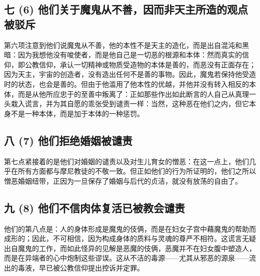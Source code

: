 
\subsection{七 (6) 他们关于魔鬼从不善，因而非天主所造的观点被驳斥}

第六项注意到他们说魔鬼从不善，他的本性不是天主的造化，而是出自混沌和黑暗：因为我想他没有唆使者，而是他自己是一切恶的根源和本体：然而真实的信仰，即公教信仰，承认一切精神或物质受造物的本体是善的，而恶没有正面存在；因为天主，宇宙的创造者，没有造出任何不是善的事物。因此，魔鬼若保持他受造时的状态，也会是善的。但由于他滥用了他本性的优越，并他并没有转入相反的本体，而是从他所应忠于的至善中叛离了：正如那些作出如此断言的人自己从真理一头栽入谎言，并为其自愿的乖张受到谴责一样：当然，这种恶在他们之内，但它本身不是一种本体，而是加于本体的一种惩罚。\par


\subsection{八 (7) 他们拒绝婚姻被谴责}

第七点紧接着的是他们对婚姻的谴责以及对生儿育女的憎恶：在这一点上，他们几乎在所有方面都与摩尼教徒的不敬一致。但正如他们的行为所证明的，他们之所以憎恶婚姻纽带，正因为一旦保存了婚姻与后代的贞洁，就没有放荡的自由了。\par


\subsection{九 (8) 他们不信肉体复活已被教会谴责}

他们的第八点是：人的身体形成是魔鬼的伎俩，而是在妇女子宫中藉魔鬼的帮助而成形的；因此，不可相信，因为构成身体的质料与灵魂的尊严不相符。这谎言无疑出自魔鬼的工作，而如此怪异的见解是恶魔的伎俩，恶魔并不在妇女腹中塑造人，而是在异端者的心中炮制这些谬误。这从不洁的毒源——尤其从邪恶的源泉——流出的毒液，早已被公教信仰提出控诉并定罪。\par

